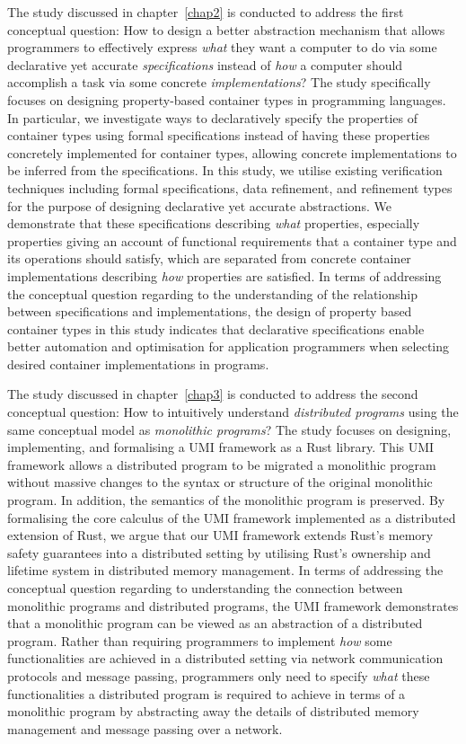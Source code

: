 The study discussed in chapter~\ref{chap2} is conducted to address the first conceptual question: How to design a better abstraction mechanism that allows programmers to effectively express \emph{what} they want a computer to do via some declarative yet accurate \emph{specifications} instead of \emph{how} a computer should accomplish a task via some concrete \emph{implementations}? The study specifically focuses on designing property-based container types in programming languages. In particular, we investigate ways to declaratively specify the properties of container types using formal specifications instead of having these properties concretely implemented for container types, allowing concrete implementations to be inferred from the specifications. In this study, we utilise existing verification techniques including formal specifications, data refinement, and refinement types for the purpose of designing declarative yet accurate abstractions. We demonstrate that these specifications describing \emph{what} properties, especially properties giving an account of functional requirements that a container type and its operations should satisfy, which are separated from concrete container implementations describing \emph{how} properties are satisfied. In terms of addressing the conceptual question regarding to the understanding of the relationship between specifications and implementations, the design of property based container types in this study indicates that declarative specifications enable better automation and optimisation for application programmers when selecting desired container implementations in programs. 

The study discussed in chapter~\ref{chap3} is conducted to address the second conceptual question: How to intuitively understand \emph{distributed programs} using the same conceptual model as \emph{monolithic programs}? The study focuses on designing, implementing, and formalising a UMI framework as a Rust library. This UMI framework allows a distributed program to be migrated a monolithic program without massive changes to the syntax or structure of the original monolithic program. In addition, the semantics of the monolithic program is preserved. By formalising the core calculus of the UMI framework implemented as a distributed extension of Rust, we argue that our UMI framework extends Rust's memory safety guarantees into a distributed setting by utilising Rust's ownership and lifetime system in distributed memory management. In terms of addressing the conceptual question regarding to understanding the connection between monolithic programs and distributed programs, the UMI framework demonstrates that a monolithic program can be viewed as an abstraction of a distributed program. Rather than requiring programmers to implement \emph{how} some functionalities are achieved in a distributed setting via network communication protocols and message passing, programmers only need to specify \emph{what} these functionalities a distributed program is required to achieve in terms of a monolithic program by abstracting away the details of distributed memory management and message passing over a network.

